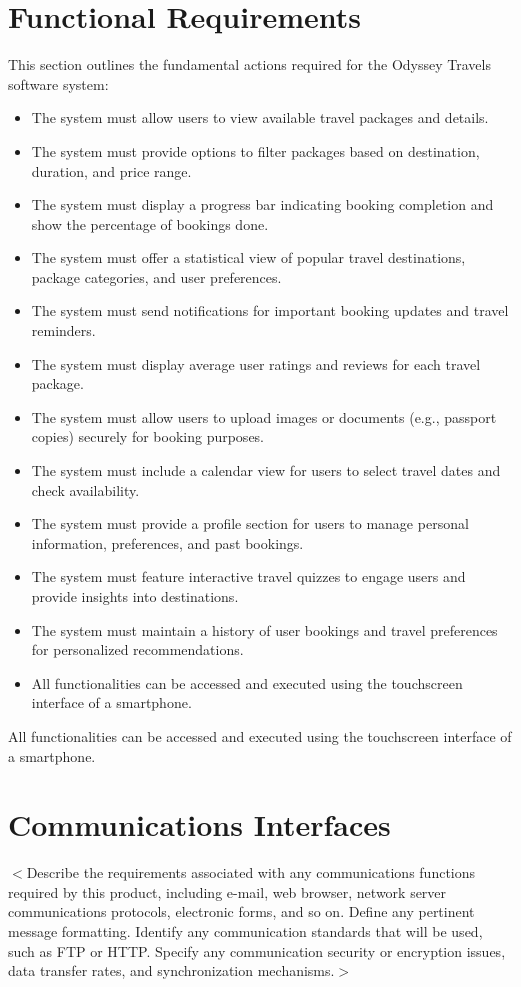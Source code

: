 \documentclass{scrreprt}
\begin{document}
\section{Functional Requirements}
This section outlines the fundamental actions required for the Odyssey Travels software system:
\begin{itemize}
    \item The system must allow users to view available travel packages and details.
    \item The system must provide options to filter packages based on destination, duration, and price range.
    \item The system must display a progress bar indicating booking completion and show the percentage of bookings done.
    \item The system must offer a statistical view of popular travel destinations, package categories, and user preferences.
    \item The system must send notifications for important booking updates and travel reminders.
    \item The system must display average user ratings and reviews for each travel package.
    \item The system must allow users to upload images or documents (e.g., passport copies) securely for booking purposes.
    \item The system must include a calendar view for users to select travel dates and check availability.
    \item The system must provide a profile section for users to manage personal information, preferences, and past bookings.
    \item The system must feature interactive travel quizzes to engage users and provide insights into destinations.
    \item The system must maintain a history of user bookings and travel preferences for personalized recommendations.
    \item All functionalities can be accessed and executed using the touchscreen interface of a smartphone.
\end{itemize}

All functionalities can be accessed and executed using the touchscreen interface of a smartphone.
\section{Communications Interfaces}
$<$Describe the requirements associated with any communications functions 
required by this product, including e-mail, web browser, network server 
communications protocols, electronic forms, and so on. Define any pertinent 
message formatting. Identify any communication standards that will be used, such 
as FTP or HTTP. Specify any communication security or encryption issues, data 
transfer rates, and synchronization mechanisms.$>$
\end{document}
